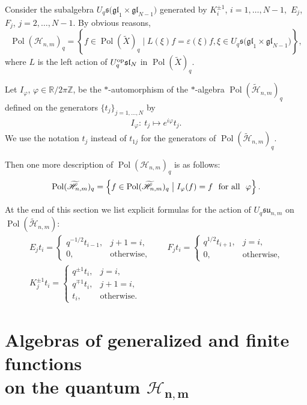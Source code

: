 Consider the subalgebra $U_q \mathfrak{s(gl}_1 \times \mathfrak{gl}_{N-1})$ generated by $K_i^{\pm 1}$,
$i=1,\dots,N-1,$ $E_j$, $F_j$, $j =2,\dots,N-1.$ By obvious reasons,
\[
\operatorname{Pol}(\mathscr{H}_{n,m})_q=\left\{f \in \operatorname{Pol}(\widetilde{X})_q \;\big|\;
L(\xi)f=\varepsilon(\xi)f, \xi \in U_q \mathfrak{s(gl}_1 \times \mathfrak{gl}_{N-1})\right\},
\]
where $L$ is the left action of $U_q^{\rm op} \mathfrak{sl}_N$ in $\operatorname{Pol}(\widetilde{X})_q$.

Let $I_\varphi$, $\varphi\in\mathbb{R}/2\pi\mathbb{Z}$, be the $*$-automorphism of the $*$-algebra
$\operatorname{Pol}(\widetilde{\mathscr{H}}_{n,m})_q$ def\/ined on the generators $\{t_j\}_{j=1,\ldots,N}$ by
\begin{gather}\label{I_phi}
I_\varphi: \ t_j\mapsto e^{i\varphi}t_j.
\end{gather}
We
use the notation $t_j$ instead of $t_{1j}$ for the generators of
$\operatorname{Pol}(\widetilde{\mathscr{H}}_{n,m})_q$.

Then one more description of $\operatorname{Pol}(\mathscr{H}_{n,m})_q$ is as follows:
\[
\operatorname{Pol}(\widetilde{\mathscr{H}}_{n,m})_q = \left\{ f\in
\operatorname{Pol}(\widetilde{\mathscr{H}}_{n,m})_q\; \big| \;I_\varphi(f)=f\text{ \ for all \
}\varphi\right\}.
\]

At the end of this section we list explicit formulas for the action of $U_{q}\mathfrak{su}_{n,m}$ on
$\operatorname{Pol}(\widetilde{\mathscr{H}}_{n,m})$:
\begin{gather*}
E_jt_i =
\begin{cases}
q^{-1/2}t_{i-1}, & j+1=i,
\\ 0, & \text{otherwise},
\end{cases}\qquad
F_jt_i =
\begin{cases}
q^{1/2}t_{i+1}, & j=i,
\\ 0, & \text{otherwise},
\end{cases}
\\ K_j^{\pm 1}t_i  =
\begin{cases}
q^{\pm 1}t_i, & j=i,
\\ q^{\mp 1}t_i, & j+1=i,
\\ t_i, & \text{otherwise}.
\end{cases}
\end{gather*}



\section[Algebras of generalized and finite functions on the quantum $\mathscr{H}_{n,m}$]{Algebras of generalized and f\/inite functions\\ on the quantum $\boldsymbol{\mathscr{H}_{n,m}}$}\label{finite}

